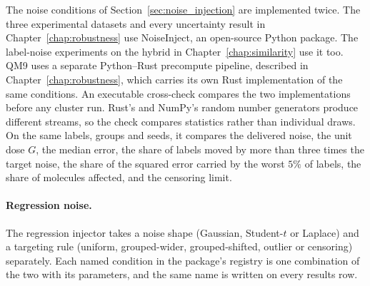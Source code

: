 
The noise conditions of Section~\ref{sec:noise_injection} are implemented twice. The three
experimental datasets and every uncertainty result in Chapter~\ref{chap:robustness} use
NoiseInject, an open-source Python package. The label-noise experiments on the hybrid in
Chapter~\ref{chap:similarity} use it too. QM9 uses a separate Python--Rust precompute pipeline,
described in Chapter~\ref{chap:robustness}, which carries its own Rust implementation of the same
conditions. An executable cross-check compares the two implementations before any cluster run.
Rust's and NumPy's random number generators produce different streams, so the check compares
statistics rather than individual draws. On the same labels, groups and seeds, it compares the
delivered noise, the unit dose $G$, the median error, the share of labels moved by more than three
times the target noise, the share of the squared error carried by the worst $5\%$ of labels, the
share of molecules affected, and the censoring limit.

\paragraph{Regression noise.} The regression injector takes a noise shape (Gaussian, Student-$t$ or
Laplace) and a targeting rule (uniform, grouped-wider, grouped-shifted, outlier or censoring)
separately. Each named condition in the package's registry is one combination of the two with its
parameters, and the same name is written on every results row.

